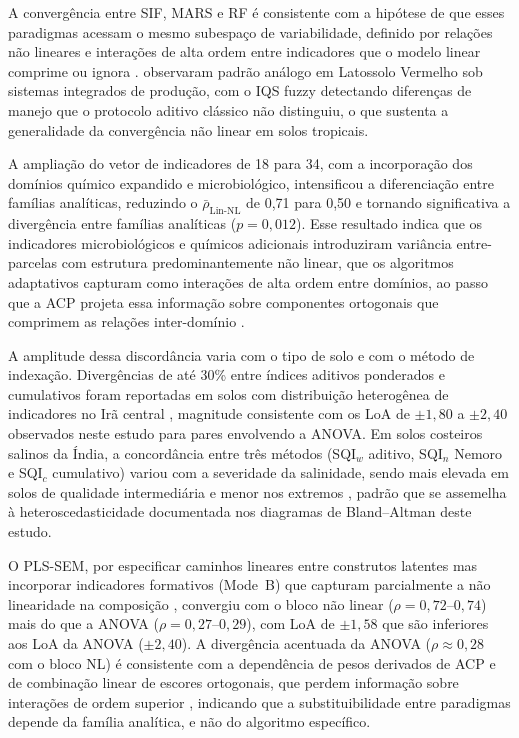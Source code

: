 \documentclass[pdflatex,sn-basic]{sn-jnl}%
\begin{document}
A convergência entre SIF, MARS e RF é consistente com a hipótese de que esses paradigmas acessam o mesmo subespaço de variabilidade, definido por relações não lineares e interações de alta ordem entre indicadores que o modelo linear comprime ou ignora \citep{Zeraatpisheh2020,Wadoux2020}. \cite{DosSantos2021} observaram padrão análogo em Latossolo Vermelho sob sistemas integrados de produção, com o IQS fuzzy detectando diferenças de manejo que o protocolo aditivo clássico não distinguiu, o que sustenta a generalidade da convergência não linear em solos tropicais.

A ampliação do vetor de indicadores de 18 para 34, com a incorporação dos domínios químico expandido e microbiológico, intensificou a diferenciação entre famílias analíticas, reduzindo o $\bar{\rho}_{\text{Lin-NL}}$ de 0,71 para 0,50 e tornando significativa a divergência entre famílias analíticas ($p = 0{,}012$). Esse resultado indica que os indicadores microbiológicos e químicos adicionais introduziram variância entre-parcelas com estrutura predominantemente não linear, que os algoritmos adaptativos capturam como interações de alta ordem entre domínios, ao passo que a ACP projeta essa informação sobre componentes ortogonais que comprimem as relações inter-domínio \citep{Rezaee2020}.

A amplitude dessa discordância varia com o tipo de solo e com o método de indexação. Divergências de até 30\% entre índices aditivos ponderados e cumulativos foram reportadas em solos com distribuição heterogênea de indicadores no Irã central \citep{Emami2024}, magnitude consistente com os LoA de $\pm 1{,}80$ a $\pm 2{,}40$ observados neste estudo para pares envolvendo a ANOVA. Em solos costeiros salinos da Índia, a concordância entre três métodos (SQI$_w$ aditivo, SQI$_n$ Nemoro e SQI$_c$ cumulativo) variou com a severidade da salinidade, sendo mais elevada em solos de qualidade intermediária e menor nos extremos \citep{Mahajan2021}, padrão que se assemelha à heteroscedasticidade documentada nos diagramas de Bland--Altman deste estudo.

O PLS-SEM, por especificar caminhos lineares entre construtos latentes mas incorporar indicadores formativos (Mode~B) que capturam parcialmente a não linearidade na composição \citep{Diamantopoulos2008}, convergiu com o bloco não linear ($\rho = 0{,}72$--$0{,}74$) mais do que a ANOVA ($\rho = 0{,}27$--$0{,}29$), com LoA de $\pm 1{,}58$ que são inferiores aos LoA da ANOVA ($\pm 2{,}40$). A divergência acentuada da ANOVA ($\rho \approx 0{,}28$ com o bloco NL) é consistente com a dependência de pesos derivados de ACP e de combinação linear de escores ortogonais, que perdem informação sobre interações de ordem superior \citep{Andrews2002,Bunemann2018}, indicando que a substituibilidade entre paradigmas depende da família analítica, e não do algoritmo específico.
\end{document}
